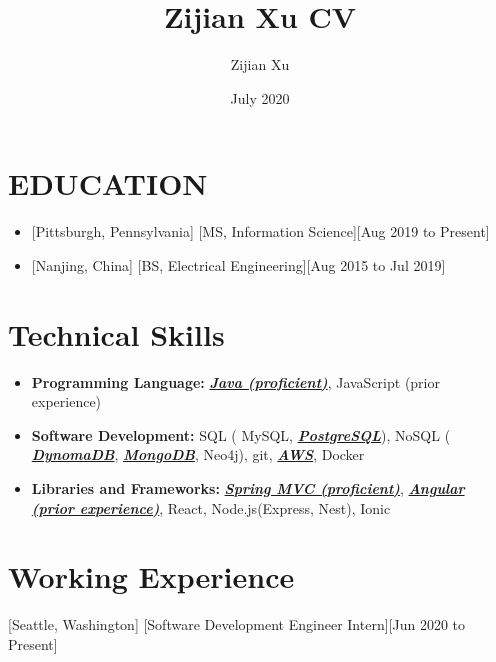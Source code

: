 \documentclass{article}
\title{Zijian Xu CV}
\author{Zijian Xu}
\date{July 2020}
\begin{document}
\makecvtitle 

\section{EDUCATION}
\begin{itemize}
\item {}[Pittsburgh, Pennsylvania]
[MS, Information Science][Aug 2019 to Present]

\item {}[Nanjing, China]
[BS, Electrical Engineering][Aug 2015 to Jul 2019]
\end{itemize}
 
\section{Technical Skills}

\begin{itemize}
\item 
\textbf{Programming Language:}
\textbf{\textit{\underline{Java (proficient)}}}, 
JavaScript (prior experience)
\item 
\textbf{Software Development:} 
SQL (
MySQL, 
\textbf{\textit{\underline{PostgreSQL}}}), 
NoSQL (
\textbf{\textit{\underline{DynomaDB}}},  \textbf{\textit{\underline{MongoDB}}}, 
Neo4j), 
git, 
\textbf{\textit{\underline{AWS}}}, 
Docker
\item 
\textbf{Libraries and Frameworks:} 
\textbf{\textit{\underline{Spring MVC (proficient)}}}, 
\textbf{\textit{\underline{Angular (prior experience)}}}, 
React, 
Node.js(Express, Nest), 
Ionic


\end{itemize}
 
\section{Working Experience}

[Seattle, Washington]
[Software Development Engineer Intern][Jun 2020 to Present]
\end{document}
